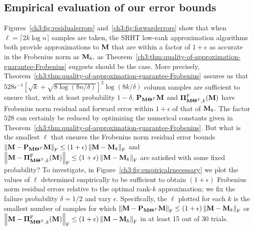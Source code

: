 \subsection{Empirical evaluation of our error bounds}
Figures~\ref{ch3:fig:residualerrors} and~\ref{ch3:fig:forwarderrors} show that when 
$\ell = \lceil 2 k \log n \rceil$ samples are taken, the SRHT low-rank approximation algorithms 
both provide approximations to $\mathbf{M}$ that are within a factor of $1 + \epsilon$ as 
accurate in the Frobenius norm as $\mathbf{M}_k,$ as Theorem~\ref{ch3:thm:quality-of-approximation-guarantee-Frobenius} 
suggests should be the case. More precisely, Theorem~\ref{ch3:thm:quality-of-approximation-guarantee-Frobenius} 
assures us that $528 \epsilon^{-1} [\sqrt{k} + \sqrt{8 \log(8 n/\delta)}]^2 \log(8k/\delta)$ column 
samples are sufficient to ensure that, with at least probability $1 - \delta$, $\mathbf{P}_{\mathbf{M} \mathbf{\Theta}^T} \mathbf{M}$ 
and $\boldsymbol{\Pi}_{\mathbf{M}\mathbf{\Theta}^T, k}^{\mathrm{F}}(\mathbf{M})$ have Frobenius norm residual and forward error 
within $1 + \epsilon$ 
of that of $\mathbf{M}_k.$ The factor $528$ can certainly be reduced by optimizing the numerical 
constants given in Theorem~\ref{ch3:thm:quality-of-approximation-guarantee-Frobenius}. 
But what is the smallest $\ell$ that ensures the
Frobenius norm residual error bounds 
$\left\|\mathbf{M} - \mathbf{P}_{\mathbf{M}\mathbf{\Theta}^T} \mathbf{M}\right\|_\mathrm{F} \leq (1 + \epsilon) \left\|\mathbf{M} - \mathbf{M}_k\right\|_\mathrm{F}$ and 
 $\left\|\mathbf{M} - \boldsymbol{\Pi}_{\mathbf{M}\mathbf{\Theta}^T, k}^{\mathrm{F}}(\mathbf{M})\right\|_\mathrm{F} \leq (1 + \epsilon) \left\|\mathbf{M} - \mathbf{M}_k\right\|_\mathrm{F}$ are 
satisfied with some fixed probability? To investigate, in Figure~\ref{ch3:fig:empiricalrnecessary} 
we plot the values of $\ell$ determined empirically to be sufficient to obtain $(1+\epsilon)$ 
Frobenius norm residual errors relative to the optimal rank-$k$ approximation; we fix the 
failure probability $\delta=1/2$ and vary $\epsilon.$ Specifically, the $\ell$ plotted for
each $k$ is the smallest number of samples for which 
$\left\|\mathbf{M} - \mathbf{P}_{\mathbf{M}\mathbf{\Theta}^T} \mathbf{M}\right\|_\mathrm{F} \leq (1 + \epsilon) \left\|\mathbf{M} - \mathbf{M}_k\right\|_\mathrm{F}$ 
or $\left\|\mathbf{M} - \boldsymbol{\Pi}_{\mathbf{M}\mathbf{\Theta}^T, k}^{\mathrm{F}}(\mathbf{M})\right\|_\mathrm{F} \leq (1 + \epsilon) \left\|\mathbf{M} - \mathbf{M}_k\right\|_\mathrm{F}$
in at least 15 out of 30 trials.

